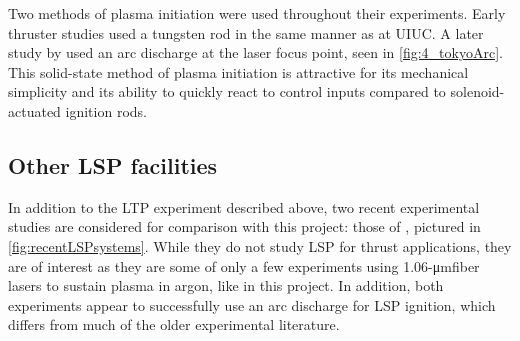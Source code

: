             Two methods of plasma initiation were used throughout their experiments. Early thruster studies used a tungsten rod in the same manner as \textcite{schwartzLasersustainedGasPlasmas1989} at UIUC. A later study by \textcite{matsuiGeneratingConditionsArgon2019} used an arc discharge at the laser focus point, seen in \autoref{fig:4_tokyoArc}. This solid-state method of plasma initiation is attractive for its mechanical simplicity and its ability to quickly react to control inputs compared to solenoid-actuated ignition rods.

        \subsection{Other LSP facilities}
            In addition to the LTP experiment described above, two recent experimental studies are considered for comparison with this project: those of \textcite{zimakovInteractionNearIRLaser2016,luCharacteristicDiagnosticsLaserStabilized2022}, pictured in \autoref{fig:recentLSPsystems}. While they do not study LSP for thrust applications, they are of interest as they are some of only a few experiments using \num{1.06}-\unit{\um}fiber lasers to sustain plasma in argon, like in this project. In addition, both experiments appear to successfully use an arc discharge for LSP ignition, which differs from much of the older experimental literature.

